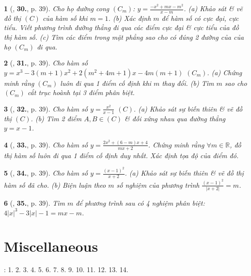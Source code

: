 \documentclass{article}
\newtheorem{baitoan}{}
\begin{document}
\begin{baitoan}[\cite{TLCT_giai_tich_12}, \textbf{30.}, p. 39]
	Cho họ đường cong $(C_m)$: $y = \frac{-x^2 + mx - m^2}{x - m}$. (a) Khảo sát \& vẽ đồ thị $(C)$ của hàm số khi $m = 1$. (b) Xác định $m$ để hàm số có cực đại, cực tiểu. Viết phương trình đường thẳng đi qua các điểm cực đại \& cực tiểu của đồ thị hàm số. (c) Tìm các điểm trong mặt phẳng sao cho có đúng 2 đường của của họ $(C_m)$ đi qua.	
\end{baitoan}

\begin{baitoan}[\cite{TLCT_giai_tich_12}, \textbf{31.}, p. 39]
	Cho hàm số $y = x^3 - 3(m + 1)x^2 + 2(m^2 + 4m + 1)x - 4m(m + 1)$ $(C_m)$. (a) Chứng minh rằng $(C_m)$ luôn đi qua 1 điểm cố định khi $m$ thay đổi. (b) Tìm $m$ sao cho $(C_m)$ cắt trục hoành tại 3 điểm phân biệt.	
\end{baitoan}

\begin{baitoan}[\cite{TLCT_giai_tich_12}, \textbf{32.}, p. 39]
	Cho hàm số $y = \frac{x^2}{x - 1}$ $(C)$. (a) Khảo sát sự biến thiên \& vẽ đồ thị $(C)$. (b) Tìm 2 điểm $A,B\in(C)$ \& đối xứng nhau qua đường thẳng $y = x - 1$.	
\end{baitoan}

\begin{baitoan}[\cite{TLCT_giai_tich_12}, \textbf{33.}, p. 39]
	Cho hàm số $y = \frac{2x^2 + (6 - m)x + 4}{mx + 2}$. Chứng minh rằng $\forall m\in\mathbb{R}$, đồ thị hàm số luôn đi qua 1 điểm cố định duy nhất. Xác định tọa độ của điểm đó.
\end{baitoan}

\begin{baitoan}[\cite{TLCT_giai_tich_12}, \textbf{34.}, p. 39]
	Cho hàm số $y = \frac{(x - 1)^2}{x + 2}$. (a) Khảo sát sự biến thiên \& vẽ đồ thị hàm số đã cho. (b) Biện luận theo $m$ số nghiệm của phương trình $\frac{(x - 1)^2}{|x + 2|} = m$.	
\end{baitoan}

\begin{baitoan}[\cite{TLCT_giai_tich_12}, \textbf{35.}, p. 39]
	Tìm $m$ để phương trình sau có 4 nghiệm phân biệt: $4|x|^3 - 3|x| - 1 = mx - m$.
\end{baitoan}


\section{Miscellaneous}
\cite[BTCCI, pp. 45--48]{SGK_Toan_12_Canh_Dieu_tap_1}: 1. 2. 3. 4. 5. 6. 7. 8. 9. 10. 11. 12. 13. 14.


\printbibliography[heading=bibintoc]
	
\end{document}
